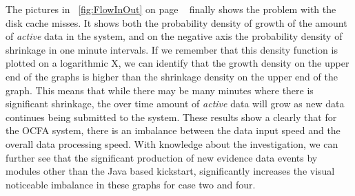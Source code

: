 The pictures in ~\ref{fig:FlowInOut} on page ~\pageref{fig:FlowInOut} finally shows the problem with the disk cache misses. It shows both the probability density of growth of the amount of \emph{active} data in the system, and on the negative axis the probability density of shrinkage in one minute intervals. If we remember that this density function is plotted on a logarithmic X, we can identify that the growth density on the upper end of the graphs is higher than the shrinkage density on the upper end of the graph. This means that while there may be many minutes where there is significant shrinkage, the over time amount of \emph{active} data will grow as new data continues being submitted to the system. These results show a clearly that for the OCFA system, there is an imbalance between the data input speed and the overall data processing speed. With knowledge about the investigation, we can further see that the significant production of new evidence data events by modules other than the Java based kickstart, significantly increases the visual noticeable imbalance in these graphs for case two and four.  
